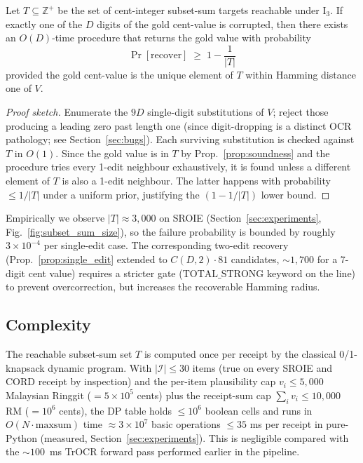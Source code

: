 \begin{proposition}
\label{prop:single_edit}
Let $T \subseteq \mathbb{Z}^+$ be the set of cent-integer subset-sum
targets reachable under $\mathrm{I}_3$.  If exactly one of the $D$
digits of the gold cent-value is corrupted, then there exists an
$O(D)$-time procedure that returns the gold value with probability
\[
\Pr[\text{recover}] \;\ge\; 1 - \frac{1}{|T|}
\]
provided the gold cent-value is the unique element of $T$ within
Hamming distance one of $V$.
\end{proposition}

\begin{proof}[Proof sketch]
Enumerate the $9D$ single-digit substitutions of $V$; reject those
producing a leading zero past length one (since digit-dropping is a
distinct OCR pathology; see Section~\ref{sec:bugs}).  Each surviving
substitution is checked against $T$ in $O(1)$.  Since the gold value
is in $T$ by Prop.~\ref{prop:soundness} and the procedure tries every
1-edit neighbour exhaustively, it is found unless a different element
of $T$ is also a 1-edit neighbour.  The latter happens with
probability $\le 1/|T|$ under a uniform prior, justifying the
$(1-1/|T|)$ lower bound.
\end{proof}

\noindent
Empirically we observe $|T| \approx 3{,}000$ on SROIE
(Section~\ref{sec:experiments}, Fig.~\ref{fig:subset_sum_size}), so
the failure probability is bounded by roughly $3 \times 10^{-4}$ per
single-edit case.  The corresponding two-edit recovery
(Prop.~\ref{prop:single_edit} extended to $C(D,2)\cdot 81$ candidates,
$\sim 1{,}700$ for a 7-digit cent value) requires a stricter gate
($\mathrm{TOTAL\_STRONG}$ keyword on the line) to prevent
overcorrection, but increases the recoverable Hamming radius.

\subsection{Complexity}
\label{sec:focus_sigma_complexity}

The reachable subset-sum set $T$ is computed once per receipt by the
classical 0/1-knapsack dynamic program.  With $|\mathcal{I}| \le 30$
items (true on every SROIE and CORD receipt by inspection) and the
per-item plausibility cap $v_i \le 5{,}000$ Malaysian Ringgit
($= 5\times 10^5$ cents) plus the receipt-sum cap
$\sum_i v_i \le 10{,}000$ RM ($= 10^6$ cents), the DP table holds
$\le 10^6$ boolean cells and runs in $O(N \cdot \mathrm{maxsum})$ time
$\approx 3 \times 10^7$ basic operations $\le 35$ ms per receipt in
pure-Python (measured, Section~\ref{sec:experiments}).  This is
negligible compared with the $\sim 100$~ms TrOCR forward pass
performed earlier in the pipeline.

